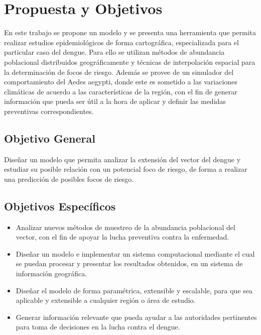 \section{Propuesta y Objetivos}
En este trabajo se propone un modelo y se presenta una herramienta que permita realizar estudios
epidemiológicos de forma cartográfica, especializada para el particular caso del dengue. Para ello
se utilizan métodos de abundancia poblacional distribuidos geográficamente y técnicas de
interpolación espacial para la determinación de focos de riesgo. Además se provee de un simulador
del comportamiento del Aedes aegypti, donde este es sometido a las variaciones climáticas de
acuerdo a las características de la región, con el fin de generar información que pueda ser útil a
la hora de aplicar y definir las medidas preventivas correspondientes.

\subsection{Objetivo General}
Diseñar un modelo que permita analizar la extensión del vector del dengue y estudiar su posible
relación con un potencial foco de riesgo, de forma a realizar una predicción de posibles focos de
riesgo.

\subsection{Objetivos Específicos}

\begin{itemize}

\item Analizar nuevos métodos de muestreo de la abundancia poblacional del vector, con el fin de apoyar la lucha preventiva contra la enfermedad.

\item Diseñar un modelo e implementar un sistema computacional mediante el cual se puedan procesar y presentar los resultados obtenidos, en un sistema de información geográfica.

\item Diseñar el modelo de forma paramétrica, extensible y escalable, para que sea aplicable y extensible a cualquier región o área de estudio.

\item Generar información relevante que pueda ayudar a las autoridades pertinentes para toma de decisiones en la lucha contra el dengue.

\end{itemize}

